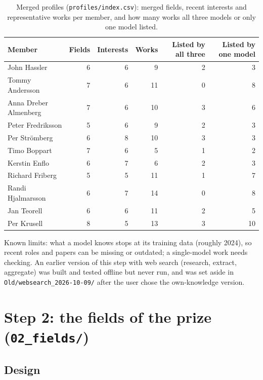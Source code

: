 \documentclass[11pt,a4paper]{article}
\newcommand{\code}[1]{\texttt{#1}}
\begin{document}
\begin{table}[h]
\small
\begin{tabular}{@{}lrrrrr@{}}
\toprule
Member & Fields & Interests & Works & Listed by all three & Listed by one model \\
\midrule
John Hassler & 6 & 6 & 9 & 2 & 3 \\
Tommy Andersson & 7 & 6 & 11 & 0 & 8 \\
Anna Dreber Almenberg & 7 & 6 & 10 & 3 & 6 \\
Peter Fredriksson & 5 & 6 & 9 & 2 & 3 \\
Per Strömberg & 6 & 8 & 10 & 3 & 3 \\
Timo Boppart & 7 & 6 & 5 & 1 & 2 \\
Kerstin Enflo & 6 & 7 & 6 & 2 & 3 \\
Richard Friberg & 5 & 5 & 11 & 1 & 7 \\
Randi Hjalmarsson & 6 & 7 & 14 & 0 & 8 \\
Jan Teorell & 6 & 6 & 11 & 2 & 5 \\
Per Krusell & 8 & 5 & 13 & 3 & 10 \\
\bottomrule
\end{tabular}
\caption{Merged profiles (\code{profiles/index.csv}): merged fields, recent interests and representative works per member, and how many works all three models or only one model listed.}
\end{table}

Known limits: what a model knows stops at its training data (roughly 2024), so recent roles and papers can be
missing or outdated; a single-model work needs checking. An earlier version of this step with web search (research,
extract, aggregate) was built and tested offline but never run, and was set aside in \code{Old/websearch\_2026-10-09/}
after the user chose the own-knowledge version.

\section{Step 2: the fields of the prize (\code{02\_fields/})}

\subsection{Design}
\end{document}
